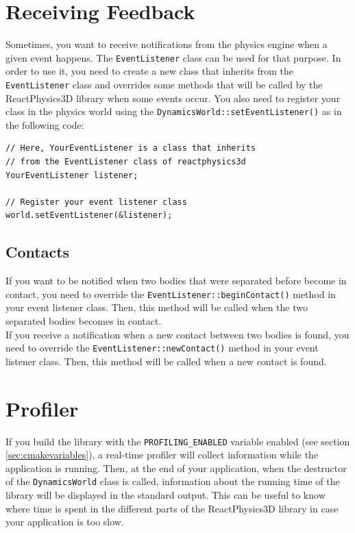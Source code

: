 \documentclass[a4paper,12pt]{article}
\begin{document}
    \section{Receiving Feedback}
    \label{sec:receiving_feedback}
    Sometimes, you want to receive notifications from the physics engine when a given event happens. The \texttt{EventListener} class can be used for that purpose. In order to use
    it, you need to create a new class that inherits from the \texttt{EventListener} class and overrides some methods that will be called by the ReactPhysics3D library when some events
    occur. You also need to register your class in the physics world using the \texttt{DynamicsWorld::setEventListener()} as in the following code: \\

    \begin{lstlisting}
// Here, YourEventListener is a class that inherits
// from the EventListener class of reactphysics3d
YourEventListener listener;

// Register your event listener class
world.setEventListener(&listener);
  \end{lstlisting}

    \subsection{Contacts}

   If you want to be notified when two bodies that were separated before become in contact, you need to override the \texttt{EventListener::beginContact()} method in your event
   listener class. Then, this method will be called when the two separated bodies becomes in contact. \\

   If you receive a notification when a new contact between two bodies is found, you need to override the \texttt{EventListener::newContact()} method in your event listener class. Then, this
   method will be called when a new contact is found.

    \section{Profiler}

    If you build the library with the \texttt{PROFILING\_ENABLED} variable enabled (see section \ref{sec:cmakevariables}), a real-time profiler will collect information while the application
    is running. Then, at the end of your application, when the destructor of the \texttt{DynamicsWorld} class is called, information about the running time of the library will be displayed in the
    standard output. This can be useful to know where time is spent in the different parts of the ReactPhysics3D library in case your application is too slow.
\end{document}
